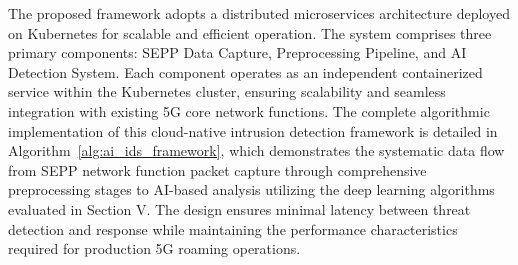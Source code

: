 \documentclass[journal,article,submit,moreauthors,pdftex]{Definitions/tsp}
\begin{document}
The proposed framework adopts a distributed microservices architecture deployed on Kubernetes for scalable and efficient operation. The system comprises three primary components: SEPP Data Capture, Preprocessing Pipeline, and AI Detection System. Each component operates as an independent containerized service within the Kubernetes cluster, ensuring scalability and seamless integration with existing 5G core network functions. The complete algorithmic implementation of this cloud-native intrusion detection framework is detailed in Algorithm~\ref{alg:ai_ids_framework}, which demonstrates the systematic data flow from SEPP network function packet capture through comprehensive preprocessing stages to AI-based analysis utilizing the deep learning algorithms evaluated in Section V. The design ensures minimal latency between threat detection and response while maintaining the performance characteristics required for production 5G roaming operations.
\end{document}
